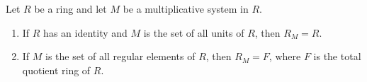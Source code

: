 Let $R$ be a ring and let $M$ be a multiplicative system in $R$.

\begin{enumerate}
\item If $R$ has an identity and $M$ is the set of all units of $R$, then $R_M = R$.
\item If $M$ is the set of all regular elements of $R$, then $R_M = F$, where $F$ is the total quotient ring of $R$.
\end{enumerate}
